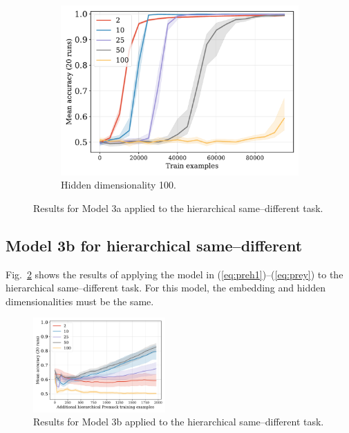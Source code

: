 \documentclass[12pt]{article}
\newcommand{\Figref}[1]{Fig.~\ref{#1}}
\newcommand{\eg}[1]{(\ref{#1})}
\newcommand{\dasheg}[2]{\eg{#1}--\eg{#2}}
\begin{document}
\begin{figure}[H]
  \begin{subfigure}{0.45\linewidth}
    \includegraphics[width=1\textwidth]{fig/flatpremack-h2-train_size-embed_dim-hidden_dim=100.pdf}
    \caption{Hidden dimensionality 100.}
  \end{subfigure}
  \caption{Results for Model 3a applied to the hierarchical same--different task.}
  \label{fig:model3a}
\end{figure}



\subsection{Model 3b for hierarchical same--different}

\Figref{fig:model3b} shows the results of applying the model in \dasheg{eq:preh1}{eq:prey} to the hierarchical same--different task. For this model, the embedding and hidden dimensionalities must be the same.

\begin{figure}[H]
  \centering
  \includegraphics[width=0.45\textwidth]{fig/inputasoutput-premack_training-embed_dim-hidden_dim=None.pdf}
  \caption{Results for Model 3b applied to the hierarchical same--different task.}
  \label{fig:model3b}
\end{figure}

\end{document}
